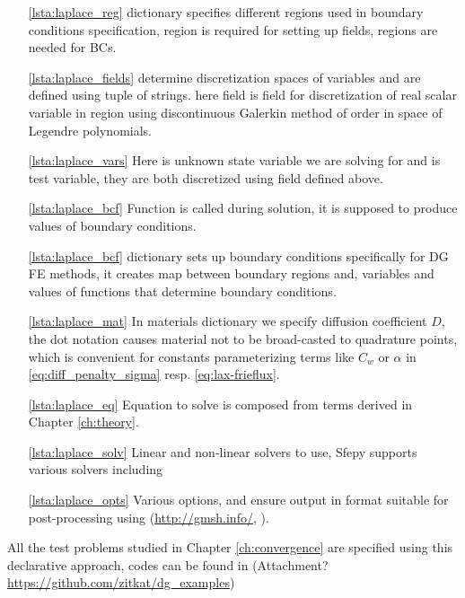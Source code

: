 \begin{itemize}
	\item[\ref{lsta:laplace_reg}]  dictionary specifies different 
	regions 
	used in	boundary conditions specification,  region is required for 
	setting up fields,  regions are needed for BCs.
	\item[\ref{lsta:laplace_fields}]   determine discretization spaces of 
	variables and are defined using tuple of strings.
	 here field  is field for discretization of real scalar 
	variable in region  using discontinuous Galerkin method of order 
	 in space of Legendre polynomials. 
	\item[\ref{lsta:laplace_vars}]  Here  is unknown state variable we are 
	solving for and  is test variable, they are both discretized using field 
	 defined above.
	\item[\ref{lsta:laplace_bcf}]  Function  is called during solution, it 
	is supposed to produce values of boundary conditions.
	\item[\ref{lsta:laplace_bcf}]  dictionary sets up boundary 
	conditions specifically for DG FE methods, it creates map between boundary regions 
	and, variables and values of functions that determine boundary conditions.
	\item[\ref{lsta:laplace_mat}] In materials dictionary we specify diffusion 
	coefficient $D$, the dot notation  
	causes material not to be broad-casted to quadrature points, which is convenient for 
	constants parameterizing terms like $C_w$ or $\alpha$ in 
	\eqref{eq:diff_penalty_sigma} 
	resp. \eqref{eq:lax-frieflux}.
	\item[\ref{lsta:laplace_eq}] Equation to solve is composed from terms derived in 
	Chapter \ref{ch:theory}.
	
	\item[\ref{lsta:laplace_solv}] Linear and non-linear solvers to use, Sfepy supports 
	various solvers including  \cite{MUMPS:2}
	
	\item[\ref{lsta:laplace_opts}] Various options,  and 
	 ensure output in format suitable for 
	post-processing using  (\url{http://gmsh.info/}, \cite{Remacle2007}).
\end{itemize}
All the test problems studied in Chapter \ref{ch:convergence} are specified using this 
declarative approach, codes can be found in (\todo Attachment? 
\url{https://github.com/zitkat/dg_examples})

